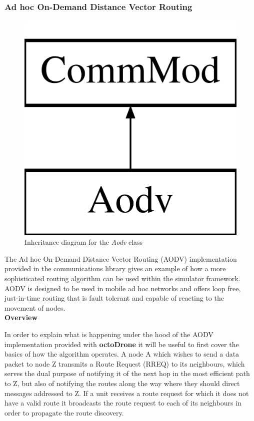 \subsubsection{Ad hoc On-Demand Distance Vector Routing}
\begin{figure}[H]
\centering	
\includegraphics[scale=0.2]{../documentation/latex/class_aodv}	
\caption{Inheritance diagram for the \textit{Aodv} class}
\end{figure}

The Ad hoc On-Demand Distance Vector Routing (AODV) implementation provided in the communications library gives an example of how a more sophisticated routing algorithm can be used within the simulator framework. AODV is designed to be used in mobile ad hoc networks and offers loop free, just-in-time routing that is fault tolerant and capable of reacting to the movement of nodes.\\

\noindent\textbf{Overview}
\label{AODVdesc}

In order to explain what is happening under the hood of the AODV implementation provided with \textbf{octoDrone} it will be useful to first cover the basics of how the algorithm operates. A node A which wishes to send a data packet to node Z transmits a Route Request (RREQ) to its neighbours, which serves the dual purpose of notifying it of the next hop in the most efficient path to Z, but also of notifying the routes along the way where they should direct messages addressed to Z\cite{perkins2003}. If a unit receives a route request for which it does not have a valid route it broadcasts the route request to each of its neighbours in order to propagate the route discovery. 

